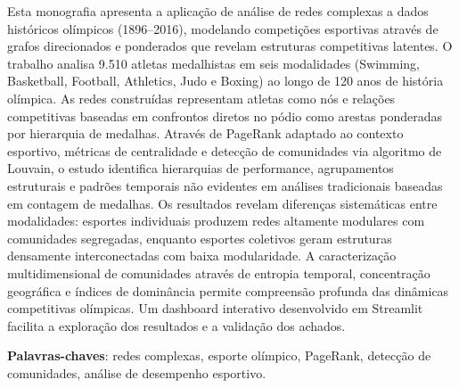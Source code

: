 \setlength{\absparsep}{18pt} %

\begin{resumo}
    Esta monografia apresenta a aplicação de análise de redes complexas a dados históricos olímpicos (1896--2016), modelando competições esportivas através de grafos direcionados e ponderados que revelam estruturas competitivas latentes. O trabalho analisa 9.510 atletas medalhistas em seis modalidades (Swimming, Basketball, Football, Athletics, Judo e Boxing) ao longo de 120 anos de história olímpica. As redes construídas representam atletas como nós e relações competitivas baseadas em confrontos diretos no pódio como arestas ponderadas por hierarquia de medalhas. Através de PageRank adaptado ao contexto esportivo, métricas de centralidade e detecção de comunidades via algoritmo de Louvain, o estudo identifica hierarquias de performance, agrupamentos estruturais e padrões temporais não evidentes em análises tradicionais baseadas em contagem de medalhas. Os resultados revelam diferenças sistemáticas entre modalidades: esportes individuais produzem redes altamente modulares com comunidades segregadas, enquanto esportes coletivos geram estruturas densamente interconectadas com baixa modularidade. A caracterização multidimensional de comunidades através de entropia temporal, concentração geográfica e índices de dominância permite compreensão profunda das dinâmicas competitivas olímpicas. Um dashboard interativo desenvolvido em Streamlit facilita a exploração dos resultados e a validação dos achados.

    \vspace{\onelineskip}

    \noindent
    \textbf{Palavras-chaves}: redes complexas, esporte olímpico, PageRank, detecção de comunidades, análise de desempenho esportivo.
\end{resumo}
